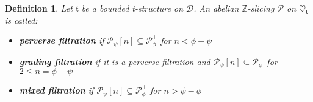 \documentclass{article}
\newtheorem{defn}[thm]{Definition}
\theoremstyle{definition}
\begin{document}
%
%

\begin{defn}
Let $\mathfrak{t}$ be a bounded t-structure on $\mathscr{D}$. An abelian $\mathbb{Z}$-slicing $\mathscr{P}$ on $\heartsuit_{\mathfrak{t}}$ is called:
\begin{itemize}
\item \textbf{perverse filtration} if $\mathscr{P}_{\psi}[n] \subseteq \mathscr{P}_{\phi}^{\perp}$ for $n < \phi - \psi$
\item \textbf{grading filtration} if it is a perverse filtration and $\mathscr{P}_{\psi}[n] \subseteq \mathscr{P}_{\phi }^{\perp}$ for $2 \le n = \phi - \psi$ 
\item \textbf{mixed filtration} if $\mathscr{P}_{\psi}[n] \subseteq \mathscr{P}_{\phi }^{\perp}$ for $n > \psi - \phi$ 
\end{itemize} 
\end{defn}
\end{document}
